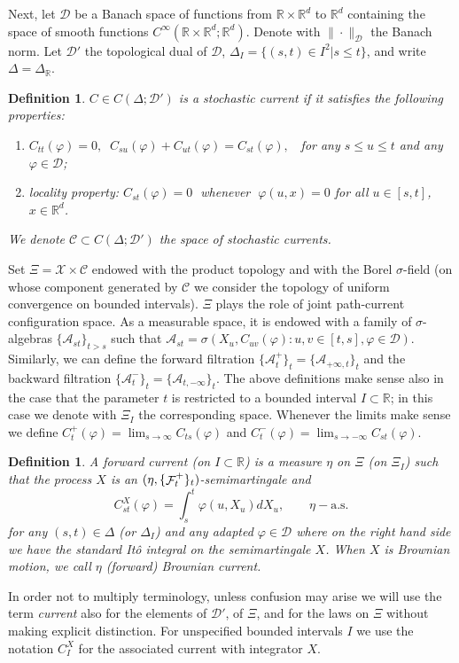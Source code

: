 \documentclass[a4paper,11pt]{article}
\newtheorem{definition}[theorem]{Definition}
\newcommand{\R}{\mathbb{R}}
\newcommand {\C}  {\ensuremath {\mathcal{C}}}
\newcommand {\A}  {\ensuremath {\mathcal{A}}}
\newcommand {\D}  {\ensuremath {\mathcal{D}}}
\newcommand{\F}{\mathop{\mathrm{{\cal F}}}\nolimits}
\newcommand{\X}{\mathcal{X}}
\begin{document}
\medskip
Next, let $\D$ be a Banach space of functions from $\R \times \R^d$
to $\R^d$ containing the space of smooth functions 
$C^\infty(\R \times \R^d; \R^d)$. Denote with $\|\cdot\|_\D$ the
Banach norm. Let $\D'$ the topological dual of $\D$, $\Delta_I =
\{(s,t)\in I^2 | s\le t\}$, and write $\Delta = \Delta_\R$. 
\begin{definition}
$C \in C(\Delta ; \D')$ is a \emph{stochastic current} if it 
satisfies the following properties:
\begin{enumerate}
\vspace{0.1cm}
\item[(1)]
$
C_{tt}(\varphi) = 0, \;\; C_{su}(\varphi) + C_{ut}(\varphi) = 
C_{st}(\varphi), \;\;
$
for any $s\le u\le t$ and any $\varphi \in \D$;
\vspace{0.1cm}
\item[(2)]
\emph{locality property:} \quad $C_{st}(\varphi)=0 \;$ 
whenever $\;\varphi(u,x)=0$ for all $u\in[s,t]$, $x \in \R^d$.
\end{enumerate}
We denote $\C \subset C(\Delta ; \D')$ the space of stochastic
currents. 
\end{definition}
Set $\Xi = \X \times \C$ endowed with the product topology and 
with the Borel $\sigma$-field (on whose component generated
by $\C$ we consider the topology of uniform convergence on bounded 
intervals). $\Xi$ plays the role of joint path-current configuration 
space. As a measurable space, it is endowed with a family of 
$\sigma$-algebras 
$\{\A_{st}\}_{t>s}$ such that $\A_{st} = \sigma(X_u, C_{uv}(\varphi) 
: u,v \in [t,s], \varphi \in \D )$. Similarly, we can define the 
forward filtration $\{\A_{t}^+\}_t = \{\A_{+\infty,t}\}_t$ and the 
backward filtration $\{\A^-_t\}_t = \{\A_{t,-\infty}\}_t$. The above 
definitions make sense also in the case that the parameter $t$ is 
restricted to a bounded interval $I\subset \R$; in this case we denote 
with $\Xi_I$ the corresponding space. Whenever the limits make sense 
we define $C^{+}_t(\varphi) = \lim_{s\to\infty} C_{ts}(\varphi)$ and 
$C^-_t(\varphi) = \lim_{s\to -\infty}C_{st}(\varphi)$.




\begin{definition}
\label{def:forward-current}
A \emph{forward current} (on $I\subset \R$) is a measure $\eta$ on
$\Xi$ (on $\Xi_I$) such  that the process $X$ is an 
$(\eta,\{\F_t^+\}_t)$-semimartingale and
\begin{equation}
  \label{eq:curr-constr-0}
C_{st}^X(\varphi) = \int_s^t \varphi(u,X_u) dX_u, 
\qquad \eta-\text{a.s.}  
\end{equation}
for any $(s,t)\in \Delta$ (or $\Delta_I$) and any adapted $\varphi \in 
\D$ where on the right hand side we have the standard It\^o integral on 
the semimartingale $X$. When $X$ is Brownian motion, we call $\eta$ 
\emph{(forward) Brownian current}. 
\end{definition}
In order not to multiply terminology, unless confusion may arise we 
will use the term \emph{current} also for the elements of $\D'$, of 
$\Xi$, and for the laws on $\Xi$ without making explicit distinction. 
For unspecified bounded intervals $I$ we use the notation $C_I^X$ for
the associated current with integrator $X$.
\end{document}
